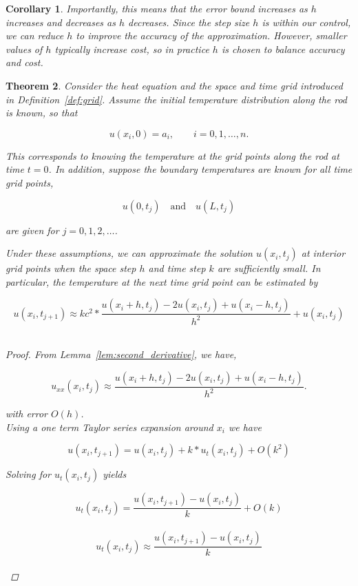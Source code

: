 \documentclass[12pt,letterpaper,reqno]{amsart}
\newtheorem{thm}{Theorem}
\newtheorem{cor}[thm]{Corollary}
\theoremstyle{definition}
\numberwithin{thm}{section}
\theoremstyle{remark}
\begin{document}
\begin{cor}
Importantly, this means that the error bound increases as $h$ increases and decreases as $h$ decreases. Since the step size $h$ is within our control, we can reduce $h$ to improve the accuracy of the approximation. However, smaller values of $h$ typically increase cost, so in practice $h$ is chosen to balance accuracy and cost.
\end{cor}

\begin{thm}
\label{thm:update_formula}
Consider the heat equation and the space and time grid introduced in Definition~\ref{def:grid}. Assume the initial temperature distribution along the rod is known, so that

\[
u(x_i,0)=a_i, \qquad i=0,1,\dots,n.
\]

This corresponds to knowing the temperature at the grid points along the rod at time $t=0$. In addition, suppose the boundary temperatures are known for all time grid points, 

\[
u(0,t_j) \quad \text{and} \quad u(L,t_j)
\]

are given for $j=0,1,2,\dots$.

Under these assumptions, we can approximate the solution $u(x_i,t_j)$ at interior grid points when the space step $h$ and time step $k$ are sufficiently small. In particular, the temperature at the next time grid point can be estimated by

\[
 u(x_i, t_{j+1}) \approx kc^2 * \frac{u(x_i+h,t_j)-2u(x_i,t_j)+u(x_i-h,t_j)}{h^2} + u(x_i, t_j)
  \]\\

\begin{proof}
From Lemma~\ref{lem:second_derivative}, we have,

\[
u_{xx}(x_i,t_j) \approx \frac{u(x_i+h,t_j)-2u(x_i,t_j)+u(x_i-h,t_j)}{h^2}.
\]

with error $O(h)$.\\

Using a one term Taylor series expansion around $x_i$ we have

\[
u(x_i,t_{j+1}) = u(x_i,t_j)+ k * u_t(x_{i},t_j) + O(k^2)\]

Solving for $u_{t}(x_i,t_j)$ yields

\[
u_t(x_{i},t_{j})  = \frac{u(x_i,t_{j+1}) - u(x_i,t_{j})}{k} + O(k)
\]\\

\[
u_t(x_{i},t_{j})  \approx \frac{u(x_i,t_{j+1}) - u(x_i,t_{j})}{k}
\]\\


\end{proof}
\end{thm}
\end{document}
